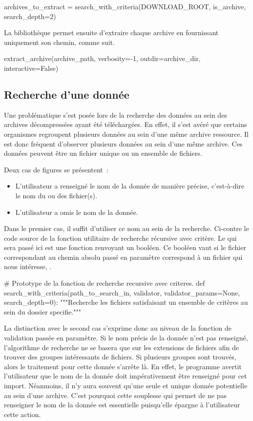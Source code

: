 \begin{Code}
    archives_to_extract = search_with_criteria(DOWNLOAD_ROOT, is_archive, search_depth=2)
\end{Code}

La bibliothèque  permet ensuite d'extraire chaque archive en fournissant uniquement son chemin, comme suit.

\begin{Code}
  extract_archive(archive_path, verbosity=-1, outdir=archive_dir, interactive=False)
\end{Code}

  \subsection{Recherche d'une donnée}

Une problématique s'est posée lors de la recherche des données au sein des archives décompressées ayant été téléchargées. En effet, il s'est avéré que certains organismes regroupent plusieurs données au sein d'une même archive ressource. Il est donc fréquent d'observer plusieurs données au sein d'une même archive. Ces données peuvent être un fichier unique ou un ensemble de fichiers.

Deux cas de figures se présentent~:
\begin{itemize}
  \item L'utilisateur a renseigné le nom de la donnée de manière précise, c'est-à-dire le nom du ou des fichier(s).
  \item L'utilisateur a omis le nom de la donnée.
\end{itemize}

Dans le premier cas, il suffit d'utiliser ce nom au sein de la recherche. Ci-contre le code source de la fonction utilitaire de recherche récursive avec critère. Le  qui sera passé ici est une fonction renvoyant un booléen. Ce booléen vaut  si le fichier correspondant au chemin absolu passé en paramètre correspond à un fichier qui nous intéresse, .

\begin{Code}
  # Prototype de la fonction de recherche recursive avec criteres.
  def search_with_criteria(path_to_search_in, validator, validator_params=None, search_depth=0):
  """Recherche les fichiers satisfaisant un ensemble de critères au sein du dossier specifie."""
\end{Code}

La distinction avec le second cas s'exprime donc au niveau de la fonction de validation passée en paramètre. Si le nom précis de la donnée n'est pas renseigné, l'algorithme de recherche ne se basera que sur les extensions de fichiers afin de trouver des groupes intéressants de fichiers. Si plusieurs groupes sont trouvés, alors le traitement pour cette donnée s'arrête là. En effet, le programme avertit l'utilisateur que le nom de la donnée doit impérativement être renseigné pour cet import. Néanmoins, il n'y aura souvent qu'une seule et unique donnée potentielle au sein d'une archive. C'est pourquoi cette souplesse qui permet de ne pas renseigner le nom de la donnée est essentielle puisqu'elle épargne à l'utilisateur cette action.


